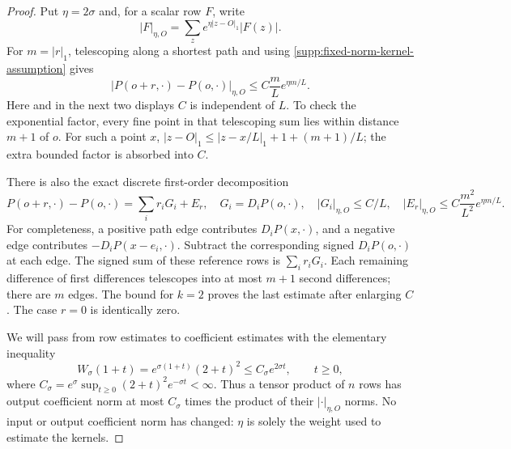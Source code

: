 \begin{proof}
Put $\eta=2\sigma$ and, for a scalar row $F$, write
\[
 |F|_{\eta,O}=\sum_z e^{\eta|z-O|_1}|F(z)|.
\]
For $m=|r|_1$, telescoping along a shortest path and using
\eqref{supp:fixed-norm-kernel-assumption} gives
\begin{equation}
 |P(o+r,\cdot)-P(o,\cdot)|_{\eta,O}
       \le C\frac mL e^{\eta m/L}.
 \label{supp:row-first}
\end{equation}
Here and in the next two displays $C$ is independent of $L$.  To check
the exponential factor, every fine point in that telescoping sum lies
within distance $m+1$ of $o$.  For such a point $x$,
$|z-O|_1\le |z-x/L|_1+1+(m+1)/L$; the extra bounded factor is absorbed
into $C$.

There is also the exact discrete first-order decomposition
\begin{equation}
 P(o+r,\cdot)-P(o,\cdot)=\sum_i r_iG_i+E_r,
 \quad G_i=D_iP(o,\cdot),\quad
 |G_i|_{\eta,O}\le C/L,
 \quad |E_r|_{\eta,O}\le C\frac{m^2}{L^2}e^{\eta m/L}.
 \label{supp:row-second}
\end{equation}
For completeness, a positive path edge contributes $D_iP(x,\cdot)$,
and a negative edge contributes $-D_iP(x-e_i,\cdot)$.  Subtract the
corresponding signed $D_iP(o,\cdot)$ at each edge.  The signed sum of
these reference rows is $\sum_i r_iG_i$.  Each remaining difference of
first differences telescopes into at most $m+1$ second differences;
there are $m$ edges.  The bound for $k=2$ proves the last estimate after
enlarging $C$.  The case $r=0$ is identically zero.

We will pass from row estimates to coefficient estimates with the
elementary inequality
\begin{equation}
 W_\sigma(1+t)=e^{\sigma(1+t)}(2+t)^2
       \le C_\sigma e^{2\sigma t},\qquad t\ge0,
 \label{supp:row-to-path}
\end{equation}
where $C_\sigma=e^\sigma\sup_{t\ge0}(2+t)^2e^{-\sigma t}<\infty$.
Thus a tensor product of $n$ rows has output coefficient norm at most
$C_\sigma$ times the product of their $|\cdot|_{\eta,O}$ norms.
No input or output coefficient norm has changed: $\eta$ is solely the
weight used to estimate the kernels.


\end{proof}
